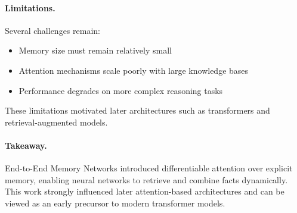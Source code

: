 \documentclass[12pt]{article}
\begin{document}
\paragraph{Limitations.}

Several challenges remain:

\begin{itemize}
		\item Memory size must remain relatively small
		\item Attention mechanisms scale poorly with large knowledge bases
		\item Performance degrades on more complex reasoning tasks
\end{itemize}

These limitations motivated later architectures such as
transformers and retrieval-augmented models.

\paragraph{Takeaway.}

End-to-End Memory Networks introduced differentiable attention over
explicit memory, enabling neural networks to retrieve and combine
facts dynamically. This work strongly influenced later attention-based
architectures and can be viewed as an early precursor to modern
transformer models.
\end{document}
